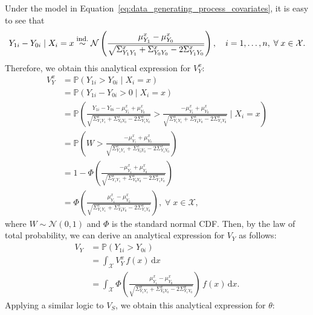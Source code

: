 \documentclass[referee,usenatbib]{biom}
\newcommand{\Prob}{\mathbb{P}}
\begin{document}
Under the model in Equation~\eqref{eq:data_generating_process_covariates}, it is easy to see that
\begin{equation*}
    Y_{1i} - Y_{0i} \mid X_{i} = x \overset{\text{\footnotesize ind.}}{\sim} \mathcal{N} \left( \frac{ \mu^{x}_{Y_{1}} - \mu^{x}_{Y_{0}}}{\sqrt{\Sigma^{x}_{Y_{1} Y_{1}} + \Sigma^{x}_{Y_{0} Y_{0}} - 2 \Sigma^{x}_{Y_{1} Y_{0}}}} \right), \quad i = 1, \ldots, n, \; \forall \; x \in \mathcal{X}.
\end{equation*}
Therefore, we obtain this analytical expression for \(V^{x}_{Y}\):
\begin{align*}
        V^{x}_{Y} & = \Prob \left( Y_{1i} > Y_{0i} \mid X_{i} = x \right) \\
        & = \Prob \left( Y_{1i} - Y_{0i} > 0 \mid X_{i} = x \right) \\
        & = \Prob \left( \frac{Y_{1i} - Y_{0i} - \mu^{x}_{Y_{1}} + \mu^{x}_{Y_{0}}}{\sqrt{\Sigma^{x}_{Y_{1} Y_{1}} + \Sigma^{x}_{Y_{0} Y_{0}} - 2 \Sigma^{x}_{Y_{1} Y_{0}}}} > \frac{- \mu^{x}_{Y_{1}} + \mu^{x}_{Y_{0}}}{\sqrt{\Sigma^{x}_{Y_{1} Y_{1}} + \Sigma^{x}_{Y_{0} Y_{0}} - 2 \Sigma^{x}_{Y_{1} Y_{0}}}} \mid X_{i} = x \right) \\
        & = \Prob \left( W > \frac{- \mu^{x}_{Y_{1}} + \mu^{x}_{Y_{0}}}{\sqrt{\Sigma^{x}_{Y_{1} Y_{1}} + \Sigma^{x}_{Y_{0} Y_{0}} - 2 \Sigma^{x}_{Y_{1} Y_{0}}}} \right) \\
        & = 1 - \Phi \left( \frac{- \mu^{x}_{Y_{1}} + \mu^{x}_{Y_{0}}}{\sqrt{\Sigma^{x}_{Y_{1} Y_{1}} + \Sigma^{x}_{Y_{0} Y_{0}} - 2 \Sigma^{x}_{Y_{1} Y_{0}}}} \right) \\
        & = \Phi \left( \frac{ \mu^{x}_{Y_{1}} - \mu^{x}_{Y_{0}}}{\sqrt{\Sigma^{x}_{Y_{1} Y_{1}} + \Sigma^{x}_{Y_{0} Y_{0}} - 2 \Sigma^{x}_{Y_{1} Y_{0}}}} \right), \; \forall \; x \in \mathcal{X},
\end{align*}
where \(W \sim \mathcal{N}(0,1)\) and \(\Phi\) is the standard normal CDF. Then, by the law of total probability, we can derive an analytical expression for \(V_{Y}\) as follows:
\begin{align*}
    V_{Y} & = \Prob \left( Y_{1i} > Y_{0i} \right) \\
    & = \int_{\mathcal{X}} V^{x}_{Y} \, f (x) \, \text{d}x \\
    & = \int_{\mathcal{X}} \Phi \left( \frac{ \mu^{x}_{Y_{1}} - \mu^{x}_{Y_{0}}}{\sqrt{\Sigma^{x}_{Y_{1} Y_{1}} + \Sigma^{x}_{Y_{0} Y_{0}} - 2 \Sigma^{x}_{Y_{1} Y_{0}}}} \right) \, f (x) \, \text{d}x.
\end{align*}
Applying a similar logic to \(V_S\), we obtain this analytical expression for \(\theta\):
\end{document}
